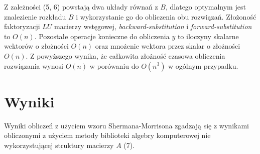 \documentclass[11pt]{extarticle}
\begin{document}
	Z zależności (5, 6) powstają dwa układy równań z \(B\), dlatego optymalnym jest znalezienie rozkładu \(B\) i wykorzystanie go do obliczenia obu rozwiązań.
	Złożoność faktoryzacji \(LU\) macierzy wstęgowej, \textit{backward-substitution} i \textit{forward-substitution} to \(O(n)\).
	Pozostałe operacje konieczne do obliczenia \(y\) to iloczyny skalarne wektorów o złożności \(O(n)\)
	oraz mnożenie wektora przez skalar o złożności \(O(n)\).
	Z powyższego wynika, że całkowita złożność czasowa obliczenia rozwiązania wynosi \(O(n)\) w porówaniu do \(O(n^3)\) w ogólnym przypadku.

	
	\section{Wyniki}

	Wyniki obliczeń z użyciem wzoru Shermana-Morrisona zgadzają się z wynikami obliczonymi z użyciem metody biblioteki algebry komputerowej nie wykorzystującej struktury macierzy \(A\) (7).
\end{document}
